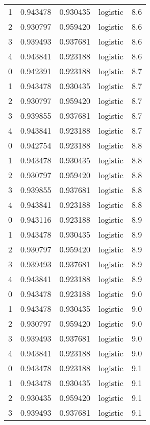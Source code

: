 \begin{tabular}{rrrlr}
     1 & 0.943478 & 0.930435 & logistic &        8.6 \\
     2 & 0.930797 & 0.959420 & logistic &        8.6 \\
     3 & 0.939493 & 0.937681 & logistic &        8.6 \\
     4 & 0.943841 & 0.923188 & logistic &        8.6 \\
     0 & 0.942391 & 0.923188 & logistic &        8.7 \\
     1 & 0.943478 & 0.930435 & logistic &        8.7 \\
     2 & 0.930797 & 0.959420 & logistic &        8.7 \\
     3 & 0.939855 & 0.937681 & logistic &        8.7 \\
     4 & 0.943841 & 0.923188 & logistic &        8.7 \\
     0 & 0.942754 & 0.923188 & logistic &        8.8 \\
     1 & 0.943478 & 0.930435 & logistic &        8.8 \\
     2 & 0.930797 & 0.959420 & logistic &        8.8 \\
     3 & 0.939855 & 0.937681 & logistic &        8.8 \\
     4 & 0.943841 & 0.923188 & logistic &        8.8 \\
     0 & 0.943116 & 0.923188 & logistic &        8.9 \\
     1 & 0.943478 & 0.930435 & logistic &        8.9 \\
     2 & 0.930797 & 0.959420 & logistic &        8.9 \\
     3 & 0.939493 & 0.937681 & logistic &        8.9 \\
     4 & 0.943841 & 0.923188 & logistic &        8.9 \\
     0 & 0.943478 & 0.923188 & logistic &        9.0 \\
     1 & 0.943478 & 0.930435 & logistic &        9.0 \\
     2 & 0.930797 & 0.959420 & logistic &        9.0 \\
     3 & 0.939493 & 0.937681 & logistic &        9.0 \\
     4 & 0.943841 & 0.923188 & logistic &        9.0 \\
     0 & 0.943478 & 0.923188 & logistic &        9.1 \\
     1 & 0.943478 & 0.930435 & logistic &        9.1 \\
     2 & 0.930435 & 0.959420 & logistic &        9.1 \\
     3 & 0.939493 & 0.937681 & logistic &        9.1 \\

\end{tabular}
